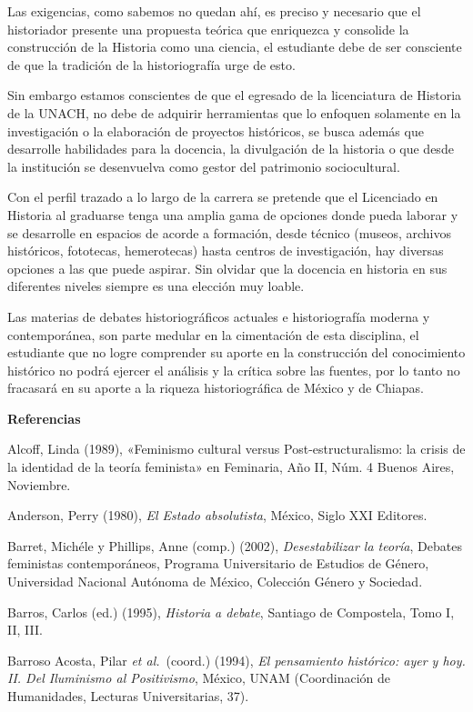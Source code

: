 Las exigencias, como sabemos no quedan ahí, es preciso y necesario que el
historiador presente una propuesta teórica que enriquezca y consolide la
construcción de la Historia como una ciencia, el estudiante debe de ser
consciente de que la tradición de la historiografía urge de esto. 

Sin embargo estamos conscientes de que el egresado de la licenciatura 
de Historia de la UNACH, no debe de adquirir herramientas que lo 
enfoquen solamente en la investigación o la elaboración de proyectos 
históricos, se busca además que desarrolle habilidades para la 
docencia, la divulgación de la historia o que desde la institución se 
desenvuelva como gestor del patrimonio sociocultural. 


Con el perfil trazado a lo largo de la carrera se pretende que el 
Licenciado en Historia al graduarse tenga una amplia gama de opciones 
donde pueda laborar y se desarrolle en espacios de acorde a formación, 
desde técnico (museos, archivos históricos, fototecas, hemerotecas) 
hasta centros de investigación, hay diversas opciones a las que puede 
aspirar. Sin olvidar que la docencia en historia en sus diferentes 
niveles siempre es una elección muy loable.

Las materias de debates historiográficos actuales e historiografía 
moderna y contemporánea, son parte medular en la cimentación de esta 
disciplina, el estudiante que no logre comprender su aporte en la 
construcción del conocimiento histórico no podrá ejercer el análisis y 
la crítica sobre las fuentes, por lo tanto no fracasará en su aporte a 
la riqueza historiográfica de México y de Chiapas.
\newpage

\textbf{Referencias}

\medskip
Alcoff, Linda (1989), «Feminismo cultural versus Post{-}estructuralismo: la crisis
de la identidad de la teoría feminista» en Feminaria, Año II, Núm. 4 Buenos Aires, Noviembre. 

Anderson, Perry (1980), \textit{El Estado absolutista}, México, Siglo XXI
Editores.

Barret, Michéle y Phillips, Anne (comp.) (2002), \textit{Desestabilizar la
teoría}, Debates feministas contemporáneos, Programa Universitario de Estudios
de Género, Universidad Nacional Autónoma de México, Colección Género y
Sociedad. 

Barros, Carlos (ed.) (1995), \textit{Historia a debate}, Santiago de
Compostela, Tomo I, II, III\@. 


Barroso Acosta, Pilar {\itshape et al.\,} (coord.) (1994), \textit{El pensamiento
histórico: ayer y hoy. II\@. Del Iluminismo al Positivismo}, México, UNAM
(Coordinación de Humanidades, Lecturas Universitarias, 37).


